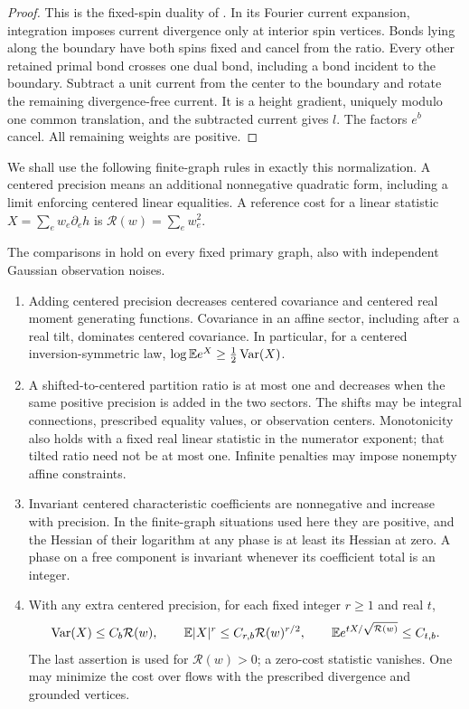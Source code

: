 \begin{proof}
This is the fixed-spin duality of \cite[Lemma 2.1]{S}.  In its Fourier
current expansion, integration imposes current divergence only at
interior spin vertices.  Bonds lying along the boundary have both
spins fixed and cancel from the ratio.  Every other retained primal
bond crosses one dual bond, including a bond incident to the boundary.
Subtract a unit current from the center to the boundary and rotate the
remaining divergence-free current.  It is a height gradient, uniquely
modulo one common translation, and the subtracted current gives \(l\).
The factors \(e^b\) cancel.  All remaining weights are positive.
\end{proof}

We shall use the following finite-graph rules in exactly this
normalization.  A centered precision means an additional nonnegative
quadratic form, including a limit enforcing centered linear equalities.
A reference cost for a linear statistic
\(X=\sum_e w_e\partial_eh\) is \(\mathcal R(w)=\sum_e w_e^2\).

\begin{proposition}\label{inp:comparisons}
The comparisons in \cite[Lemmas 2.2 and
2.3]{X} hold on every fixed primary graph,
also with independent Gaussian observation noises.
\begin{enumerate}
\item Adding centered precision decreases centered covariance and
centered real moment generating functions.  Covariance in an affine
sector, including after a real tilt, dominates centered covariance.
In particular, for a centered inversion-symmetric law,
\(\log\mathbb E e^X\ge\frac12\operatorname{Var}(X)\).
\item A shifted-to-centered partition ratio is at most one and
decreases when the same positive precision is added in the two
sectors.  The shifts may be integral connections, prescribed equality
values, or observation centers.  Monotonicity also holds with a fixed
real linear statistic in the numerator exponent; that tilted ratio
need not be at most one.  Infinite penalties may impose nonempty
affine constraints.
\item Invariant centered characteristic coefficients are nonnegative
and increase with precision.  In the finite-graph situations used
here they are positive, and the Hessian of their logarithm at any
phase is at least its Hessian at zero.  A phase on a free component
is invariant whenever its coefficient total is an integer.
\item With any extra centered precision, for each fixed integer
\(r\ge1\) and real \(t\),
\begin{equation}\label{inp:reference-cost}
 \operatorname{Var}(X)\le C_b\mathcal R(w),\qquad
 \mathbb E|X|^r\le C_{r,b}\mathcal R(w)^{r/2},\qquad
 \mathbb E e^{tX/\sqrt{\mathcal R(w)}}\le C_{t,b}.
\end{equation}
The last assertion is used for \(\mathcal R(w)>0\); a zero-cost
statistic vanishes.  One may minimize the cost over flows with the
prescribed divergence and grounded vertices.
\end{enumerate}
\end{proposition}

